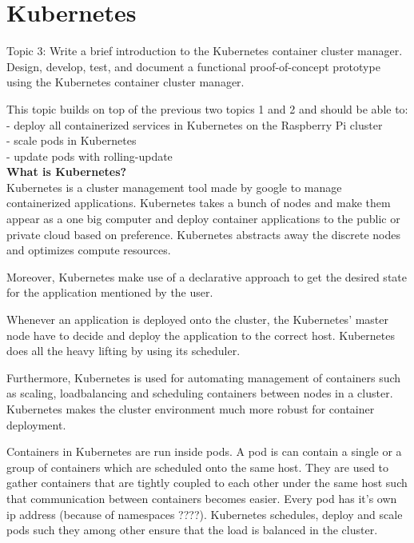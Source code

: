 \chapter{Kubernetes}\label{ch:kubernetes}
Topic 3: Write a brief introduction to the Kubernetes container cluster manager. 
Design, develop, test, and document a functional proof-of-concept prototype using the Kubernetes container cluster manager. 

This topic builds on top of the previous two topics 1 and 2 and should be able to:\\
- deploy all containerized services in Kubernetes on the Raspberry Pi cluster \\
- scale pods in Kubernetes \\
- update pods with rolling-update \\

\textbf{What is Kubernetes?}\\
Kubernetes is a cluster management tool made by google to manage containerized applications. Kubernetes takes a bunch of nodes and make them appear as a one big computer and deploy container applications to the public or private cloud based on preference. Kubernetes abstracts away the discrete nodes and optimizes compute resources.  

Moreover, Kubernetes make use of a declarative approach to get the desired state for the application mentioned by the user. 

Whenever an application is deployed onto the cluster, the Kubernetes' master node have to decide and deploy the application to the correct host. Kubernetes does all the heavy lifting by using its scheduler. 

Furthermore, Kubernetes is used for automating management of containers such as scaling, loadbalancing and scheduling containers between nodes in a cluster. Kubernetes makes the cluster environment much more robust for container deployment.

Containers in Kubernetes are run inside pods. A pod is can contain a single or a group of containers which are scheduled onto the same host. They are used to gather containers that are tightly coupled to each other under the same host such that communication between containers becomes easier. Every pod has it's own ip address (because of namespaces ????). Kubernetes schedules, deploy and scale pods such they among other ensure that the load is balanced in the cluster. 

